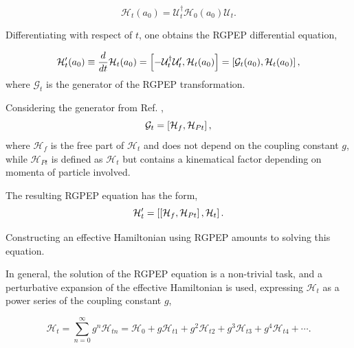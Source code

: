 \documentclass[11pt,a4paper,twoside,pdf]{article}
\numberwithin{equation}{section}
\begin{document}
\begin{equation}
    \mathcal{H}_t(a_0) = \mathcal{U}_t^\dagger\mathcal{H}_0(a_0) \mathcal{U}_t.
\end{equation}

Differentiating with respect of $t$, one obtains the RGPEP differential equation,

\begin{equation}
    \mathcal{H}_t^\prime (a_0) \equiv \frac{d}{dt}\mathcal{H}_t(a_0) = 
    \left[ -\mathcal{U}_t^\dagger \mathcal{U}_t^\prime, \mathcal{H}_t(a_0) \right] 
    = \left[ \mathcal{G}_t(a_0), \mathcal{H}_t(a_0) \right],
\end{equation}
where $\mathcal{G}_t$ is the generator of the RGPEP transformation. 

Considering the generator from Ref. \cite{PEP},
\begin{equation}
    \mathcal{G}_t = \left[ \mathcal{H}_f, \mathcal{H}_{Pt} \right],
\end{equation}
where $\mathcal{H}_f$ is the free part of $\mathcal{H}_t$ and does not depend on 
the coupling constant \( g \), 
while $\mathcal{H}_{Pt}$ is defined as $\mathcal{H}_t$ but contains a kinematical factor
depending on momenta of particle involved.

The resulting RGPEP equation has the form,
\begin{equation}
    \mathcal{H}_t^\prime =  \left[ \left[ \mathcal{H}_f, \mathcal{H}_{Pt} \right], \mathcal{H}_t \right].
\end{equation}

Constructing an effective Hamiltonian using RGPEP amounts to solving this equation.

In general, the solution of the RGPEP equation is a non-trivial task, and a perturbative
expansion of the effective Hamiltonian is used, expressing  
$\mathcal{H}_t$ as a power series of the coupling constant $g$,

\begin{equation}
    \mathcal{H}_t = \sum_{n=0}^{\infty} g^n \mathcal{H}_{t n} = 
    \mathcal{H}_{0} + g \mathcal{H}_{t 1} + g^2 \mathcal{H}_{t 2} + g^3 \mathcal{H}_{t 3} +
    g^4 \mathcal{H}_{t 4} + \cdots.
\end{equation}
\end{document}
